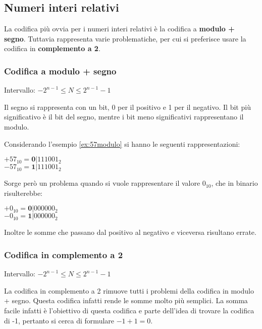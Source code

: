 \documentclass[a4paper]{article}
\theoremstyle{break}
\theoremstyle{break}
\theoremstyle{break}
\theoremstyle{break}
\begin{document}
\subsection{Numeri interi relativi}
La codifica più ovvia per i numeri interi relativi è la codifica a
\textbf{modulo + segno}. Tuttavia rappresenta varie problematiche, per cui
si preferisce usare la codifica in \textbf{complemento a 2}.

\subsubsection{Codifica a modulo + segno}
\begin{center}
	Intervallo: \( -2^{n-1} \le N \le 2^{n-1}-1 \)
\end{center}
Il segno si rappresenta con un bit, 0 per il positivo e 1 per il negativo.
Il bit più significativo è il bit del segno, mentre i bit meno significativi
rappresentano il modulo.

\begin{center}
\end{center}
Considerando l'esempio \ref{ex:57modulo} si hanno le seguenti rappresentazioni:

\begin{center}
	\( +57_{10}=\textbf{0}|111001_2 \)\\
	\( -57_{10}=\textbf{1}|111001_2 \)
\end{center}
Sorge però un problema quando si vuole rappresentare il valore \( 0_{10} \),
che in binario risulterebbe:

\begin{center}
	\( +0_{10}=\textbf{0}|000000_2 \)\\
	\( -0_{10}=\textbf{1}|000000_2 \)
\end{center}
Inoltre le somme che passano dal positivo al negativo e viceversa risultano errate.

\subsubsection{Codifica in complemento a 2}
\begin{center}
	Intervallo: \( -2^{n-1} \le N \le 2^{n-1}-1 \)
\end{center}
La codifica in complemento a 2 rimuove tutti i problemi della codifica in modulo
+ segno. Questa codifica infatti rende le somme molto più semplici. La somma facile
infatti è l'obiettivo di questa codifica e parte dell'idea di trovare la
codifica di -1, pertanto si cerca di formulare \( -1+1=0 \).
\end{document}

